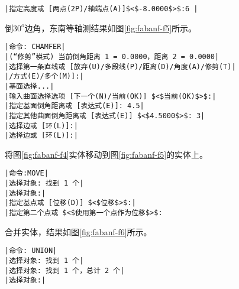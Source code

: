 \begin{procedure}
\begin{lstlisting}
|指定高度或 [两点(2P)/轴端点(A)]$<$-8.0000$>$:6 |
\end{lstlisting}
\item 倒$30^o$边角，东南等轴测结果如图\ref{fig:fabanf-f5}所示。
\begin{lstlisting}
|命令: CHAMFER|
|(“修剪”模式) 当前倒角距离 1 = 0.0000，距离 2 = 0.0000|
|选择第一条直线或 [放弃(U)/多段线(P)/距离(D)/角度(A)/修剪(T)|
|/方式(E)/多个(M)]:|
|基面选择...|
|输入曲面选择选项 [下一个(N)/当前(OK)] $<$当前(OK)$>$:|
|指定基面倒角距离或 [表达式(E)]: 4.5|
|指定其他曲面倒角距离或 [表达式(E)] $<$4.5000$>$: 3|
|选择边或 [环(L)]:|
|选择边或 [环(L)]:|
\end{lstlisting}
\item 将图\ref{fig:fabanf-f4}实体移动到图\ref{fig:fabanf-f5}的实体上。
\begin{lstlisting}
|命令:MOVE|
|选择对象: 找到 1 个|
|选择对象:|
|指定基点或 [位移(D)] $<$位移$>$:|
|指定第二个点或 $<$使用第一个点作为位移$>$:
\end{lstlisting}
\item 合并实体，结果如图\ref{fig:fabanf-f6}所示。
\begin{lstlisting}
|命令: UNION|
|选择对象: 找到 1 个|
|选择对象: 找到 1 个，总计 2 个|
|选择对象:|
\end{lstlisting}
\end{procedure}
